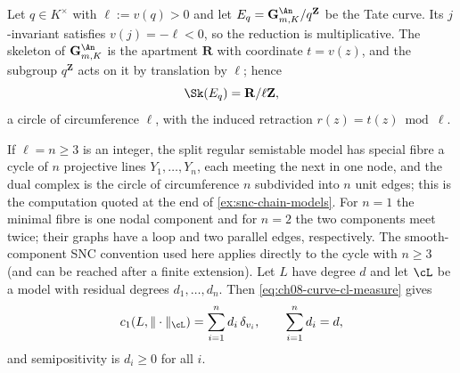 \begin{example}
\label{ex:ch08-tate-curve}
Let $q\in K^\times$ with $\ell:=v(q)>0$ and let
$E_q=\mathbf G_{m,K}^{\An}/q^{\mathbf Z}$ be the Tate curve.  Its
$j$-invariant satisfies $v(j)=-\ell<0$, so the reduction is multiplicative.
The skeleton of $\mathbf G_{m,K}^{\An}$ is the apartment $\mathbf R$ with
coordinate $t=v(z)$, and the subgroup $q^{\mathbf Z}$ acts on it by
translation by $\ell$; hence
\[
 \Sk(E_q)=\mathbf R/\ell\mathbf Z ,
\]
a circle of circumference $\ell$, with the induced retraction
$r(z)=t(z)\bmod\ell$.

If $\ell=n\geq3$ is an integer, the split regular semistable model has
special fibre a cycle of $n$ projective lines
$Y_1,\ldots,Y_n$, each meeting the next in one node, and the dual complex is
the circle of circumference $n$ subdivided into $n$ unit edges; this is the
computation quoted at the end of \cref{ex:snc-chain-models}.  For $n=1$
the minimal fibre is one nodal component and for $n=2$ the two components
meet twice; their graphs have a loop and two parallel edges, respectively.
The smooth-component SNC convention used here applies directly to the
cycle with $n\geq3$ (and can be reached after a finite extension).  Let $L$ have
degree $d$ and let $\cL$ be a model with residual degrees
$d_1,\ldots,d_n$.  Then \eqref{eq:ch08-curve-cl-measure} gives
\[
 c_1(L,\|\cdot\|_{\cL})=\sum_{i=1}^nd_i\,\delta_{v_i},
 \qquad
 \sum_{i=1}^nd_i=d ,
\]
and semipositivity is $d_i\geq0$ for all $i$.


\end{example}
